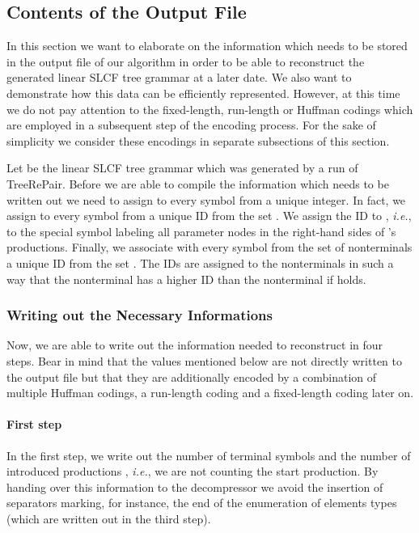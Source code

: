 \documentclass[12pt]{llncs}
\newcommand{\trp}{\mbox{TreeRePair}\xspace}
\newcommand{\hairsp}{\hspace{1pt}}\newcommand{\TODO}{\textcolor{red}{\bf TODO!}\xspace}
\newcommand{\ie}{\mbox{\textit{i.\hairsp{}e.}}\xspace}
\begin{document}
\subsection{Contents of the Output File}\label{sec:contentsOutputFile}

In this section we want to elaborate on the information which needs to be stored in the output file of our algorithm in order to be able to reconstruct the generated linear SLCF tree grammar at a later date. We also want to demonstrate how this data can be efficiently represented. However, at this time we do not pay attention to the fixed-length, run-length or Huffman codings which are employed in a subsequent step of the encoding process. For the sake of simplicity we consider these encodings in separate subsections of this section.

Let  be the linear SLCF tree grammar which was generated by a run of \trp. Before we are able to compile the information which needs to be written out we need to assign to every symbol from  a unique integer. In fact, we assign to every symbol from  a unique ID from the set \mbox{}. We assign the ID  to , \ie, to the special symbol labeling all parameter nodes in the right-hand sides of 's productions. Finally, we associate with every symbol from the set of nonterminals  a unique ID from the set . The IDs are assigned to the nonterminals in such a way that the nonterminal  has a higher ID than the nonterminal  if  holds.

\subsubsection{Writing out the Necessary Informations}

Now, we are able to write out the information needed to reconstruct  in four steps. Bear in mind that the values mentioned below are not directly written to the output file but that they are additionally encoded by a combination of multiple Huffman codings, a run-length coding and a fixed-length coding later on. 

\paragraph*{First step} In the first step, we write out the number of terminal symbols  and the number of introduced productions , \ie, we are not counting the start production. By handing over this information to the decompressor we avoid the insertion of separators marking, for instance, the end of the enumeration of elements types (which are written out in the third step).
\end{document}
